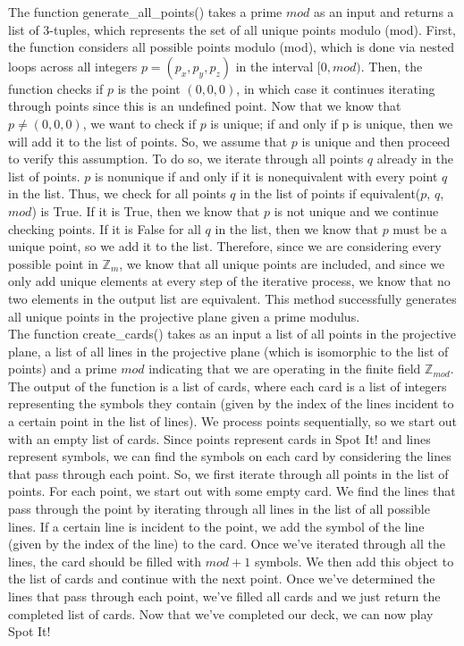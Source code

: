 \documentclass{article}
\begin{document}
    The function generate\_all\_points() takes a prime $mod$ as an input and returns a list of 3-tuples, which represents the set of all unique points modulo (mod). First, the function considers all possible points modulo (mod), which is done via nested loops across all integers $p = (p_x, p_y, p_z)$ in the interval $[0, mod)$. Then, the function checks if $p$ is the point $(0, 0, 0)$, in which case it continues iterating through points since this is an undefined point. Now that we know that $p \neq (0, 0, 0)$, we want to check if $p$ is unique; if and only if p is unique, then we will add it to the list of points. So, we assume that $p$ is unique and then proceed to verify this assumption. To do so, we iterate through all points $q$ already in the list of points. $p$ is nonunique if and only if it is nonequivalent with every point $q$ in the list. Thus, we check for all points $q$ in the list of points if equivalent($p$, $q$, $mod$) is True. If it is True, then we know that $p$ is not unique and we continue checking points. If it is False for all $q$ in the list, then we know that $p$ must be a unique point, so we add it to the list. Therefore, since we are considering every possible point in $\mathbb{Z}_m$, we know that all unique points are included, and since we only add unique elements at every step of the iterative process, we know that no two elements in the output list are equivalent. This method successfully generates all unique points in the projective plane given a prime modulus.\\
    
    The function create\_cards() takes as an input a list of all points in the projective plane, a list of all lines in the projective plane (which is isomorphic to the list of points) and a prime $mod$ indicating that we are operating in the finite field $\mathbb{Z}_{mod}$. The output of the function is a list of cards, where each card is a list of integers representing the symbols they contain (given by the index of the lines incident to a certain point in the list of lines). We process points sequentially, so we start out with an empty list of cards. Since points represent cards in Spot It! and lines represent symbols, we can find the symbols on each card by considering the lines that pass through each point. So, we first iterate through all points in the list of points. For each point, we start out with some empty card. We find the lines that pass through the point by iterating through all lines in the list of all possible lines. If a certain line is incident to the point, we add the symbol of the line (given by the index of the line) to the card. Once we've iterated through all the lines, the card should be filled with $mod + 1$ symbols. We then add this object to the list of cards and continue with the next point. Once we've determined the lines that pass through each point, we've filled all cards and we just return the completed list of cards. Now that we've completed our deck, we can now play Spot It! 
\end{document}
